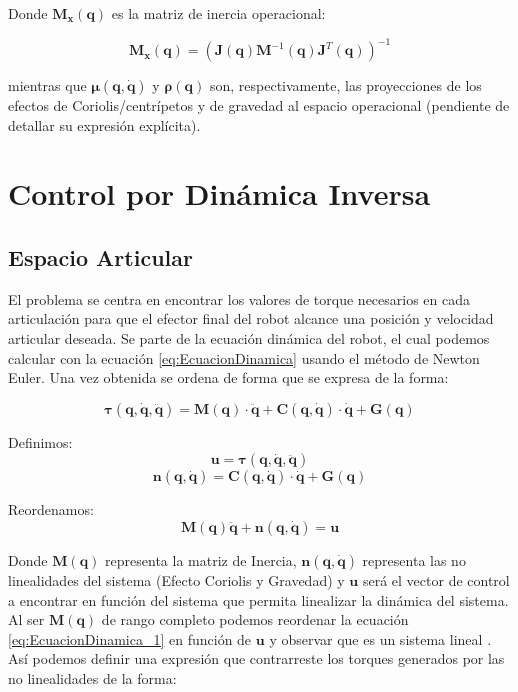 Donde $\boldsymbol{M_x}(\boldsymbol{q})$ es la matriz de inercia operacional:

\begin{equation}
    \boldsymbol{M_x}(\boldsymbol{q}) = \left( \boldsymbol{J}(\boldsymbol{q}) \boldsymbol{M}^{-1}(\boldsymbol{q}) \boldsymbol{J}^T(\boldsymbol{q}) \right)^{-1}
\end{equation}

mientras que $\boldsymbol{\mu}(\boldsymbol{q}, \boldsymbol{\dot{q}})$ y $\boldsymbol{\rho}(\boldsymbol{q})$ son, respectivamente, las
proyecciones de los efectos de Coriolis/centrípetos y de gravedad al espacio
operacional (pendiente de detallar su expresión explícita).

\section{Control por Dinámica Inversa}
\subsection{Espacio Articular}
El problema se centra en encontrar los valores de torque necesarios en cada
articulación para que el efector final del robot alcance una posición y
velocidad articular deseada. Se parte de la ecuación dinámica del robot, el
cual podemos calcular con la ecuación \ref{eq:EcuacionDinamica} usando el
método de Newton Euler. Una vez obtenida se ordena de forma que se expresa de
la forma:

\begin{equation}
    \boldsymbol{\tau(q,\dot{q},\ddot{q})} = \boldsymbol{M(q)\cdot \ddot{q}} +
    \boldsymbol{C(q,\dot{q}) \cdot \dot{q}} + \boldsymbol{G(q)}
\end{equation}

Definimos:
\begin{equation*}
    \boldsymbol{u}=\boldsymbol{\tau(q,\dot{q},\ddot{q})}
\end{equation*}
\begin{equation*}
    \boldsymbol{n(q,\dot{q})}=\boldsymbol{C(q,\dot{q}) \cdot \dot{q}} +
    \boldsymbol{G(q)}
\end{equation*}

Reordenamos:
\begin{equation}
    \boldsymbol{M(q)\ddot{q}} + \boldsymbol{n(q,\dot{q})} = \boldsymbol{u}
    \label{eq:EcuacionDinamica_1}
\end{equation}

Donde $\boldsymbol{M(q)}$ representa la matriz de Inercia,
$\boldsymbol{n(q,\dot{q})}$ representa las no linealidades del sistema (Efecto
Coriolis y Gravedad) y $\boldsymbol{u}$ será el vector de control a encontrar
en función del sistema que permita linealizar la dinámica del sistema.
Al ser $\boldsymbol{M(q)}$ de rango completo podemos reordenar la ecuación
\ref{eq:EcuacionDinamica_1} en función de $\boldsymbol{u}$ y observar que es un
sistema lineal \cite{siciliano_robotics_2009}. Así podemos definir una
expresión que contrarreste los torques generados por las no linealidades de la
forma:

